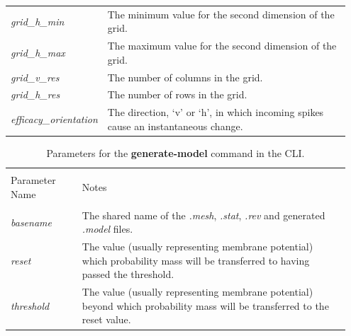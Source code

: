 \documentclass[utf8]{frontiersSCNS} %
\begin{document}
\begin{table}[ht!]
\begin{tabular}{|p{0.2\linewidth} | p{0.75\linewidth}|}
    \textit{grid\_h\_min} & The minimum value for the second dimension of the grid.\\
    \textit{grid\_h\_max} & The maximum value for the second dimension of the grid.\\
    \textit{grid\_v\_res} & The number of columns in the grid.\\
    \textit{grid\_h\_res} & The number of rows in the grid.\\
    \textit{efficacy\_orientation} & The direction, `v' or `h', in which incoming spikes cause an instantaneous change. \\
    \hline
    \end{tabular}
\label{tab:gridgenerate}
\end{table}

\begin{table}[ht!]
\caption{Parameters for the \textbf{generate-model} command in the CLI.}
    \centering
    \begin{tabular}{|p{0.2\linewidth} | p{0.75\linewidth}|}
    \hline
    &\\
    Parameter Name & Notes \\
    \hline
    &\\
    \textit{basename} & The shared name of the \textit{.mesh}, \textit{.stat}, \textit{.rev} and generated \textit{.model} files.\\
    \textit{reset} & The value (usually representing membrane potential) which probability mass will be transferred to having passed the threshold.\\
    \textit{threshold} & The value (usually representing membrane potential) beyond which probability mass will be transferred to the reset value.\\
    \hline
    \end{tabular}
\label{tab:generatemodel}
\end{table}
\end{document}
